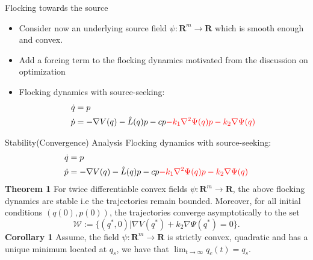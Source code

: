 \begin{frame}{Flocking towards the source}
\begin{itemize}
\item Consider now an underlying source field $\psi:\mathbf{R}^m \xrightarrow{} \mathbf{R}$ which is smooth enough and convex.
\item Add a forcing term to the flocking dynamics motivated from the discussion on optimization
\item Flocking dynamics with source-seeking:
\begin{equation*}
\begin{split}
\Dot{q}&=p\\
\Dot{p}&=-\nabla V(q)-\hat{L}(q)p -cp\textcolor{red}{-k_1\nabla^2 \Psi(q) p -k_2 \nabla \Psi(q)}
\end{split}
\end{equation*}
\end{itemize}
\end{frame}
\begin{frame}{Stability(Convergence) Analysis}
	Flocking dynamics with source-seeking:
	\begin{equation*}
	\begin{split}
	\Dot{q}&=p\\
	\Dot{p}&=-\nabla V(q)-\hat{L}(q)p -cp\textcolor{red}{-k_1\nabla^2 \Psi(q) p -k_2 \nabla \Psi(q)}
	\end{split}
	\end{equation*}
\textbf{Theorem 1} For twice differentiable convex fields $\psi:\mathbf{R}^m \xrightarrow{} \mathbf{R}$, the above flocking dynamics are stable i.e the trajectories remain bounded. Moreover, for all initial conditions $(q(0),p(0))$, the trajectories converge asymptotically to the set $$\mathcal{W}:=\{(q^*,0)|\nabla V (q^*)+ k_2\nabla\Psi(q^*) = 0 \}.$$
\textbf{Corollary 1} Assume, the field $\psi:\mathbf{R}^m \xrightarrow{} \mathbf{R}$ is strictly convex, quadratic and has a unique minimum located at $q_s$, we have that $\lim_{t\rightarrow \infty}q_c(t)=q_s$.

\end{frame}
